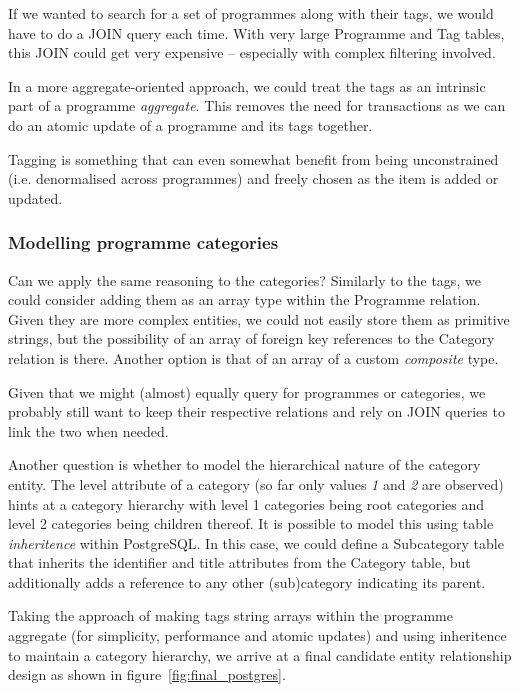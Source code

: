 \documentclass[11pt,a4paper]{article}
\begin{document}
If we wanted to search for a set of programmes along with their tags, we would
have to do a JOIN query each time. With very large Programme and Tag tables, this
JOIN could get very expensive -- especially with complex filtering involved.

In a more aggregate-oriented approach, we could treat the tags as an
intrinsic part of a programme \emph{aggregate}. This removes the need
for transactions as we can do an atomic update of a programme
and its tags together.

Tagging is something that can even somewhat benefit from being unconstrained
(i.e. denormalised across programmes)
and freely chosen as the item is added or updated. \cite{smith2008tagging}

\subsubsection{Modelling programme categories}

Can we apply the same reasoning to the categories? Similarly to the
tags, we could consider adding them as an array type within the
Programme relation. Given they are more complex entities, we could
not easily store them as primitive strings, but the possibility of an
array of foreign key references to the Category relation is there. Another
option is that of an array of a custom \emph{composite} type.

Given that we might (almost) equally query for programmes or categories,
we probably still want to keep their respective relations and rely on
JOIN queries to link the two when needed.

Another question is whether to model the hierarchical nature of the
category entity. The level attribute of a category (so far only values
\emph{1} and \emph{2} are observed) hints at a category hierarchy with
level 1 categories being root categories and level 2 categories being
children thereof. It is possible to model this using table
\emph{inheritence} within PostgreSQL. In this case, we could define
a Subcategory table that inherits the identifier and title attributes
from the Category table, but additionally adds a reference to any
other (sub)category indicating its parent.

Taking the approach of making tags string arrays within the programme
aggregate (for simplicity, performance and atomic updates) and using
inheritence to maintain a category hierarchy, we arrive at a final
candidate entity relationship design as shown in figure~\ref{fig:final_postgres}.
\end{document}
